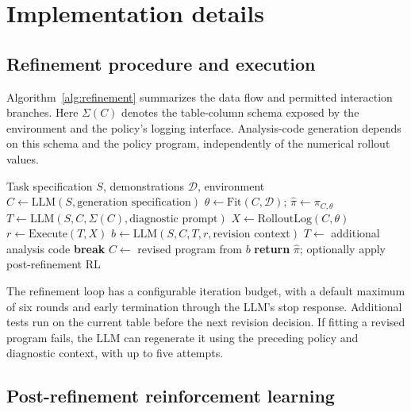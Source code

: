 \section{Implementation details}
\label{app:training}

\subsection{Refinement procedure and execution}
\label{app:procedure}
Algorithm~\ref{alg:refinement} summarizes the data flow and permitted interaction branches.
Here $\Sigma(C)$ denotes the table-column schema exposed by the environment and the policy's logging interface.
Analysis-code generation depends on this schema and the policy program, independently of the numerical rollout values.

\begin{algorithm}[htbp]
\caption{Refinement through semantic rollout analysis}
\label{alg:refinement}
\begin{algorithmic}[1]
\REQUIRE Task specification $S$, demonstrations $\mathcal D$, environment
\STATE $C\gets\mathrm{LLM}(S,\text{generation specification})$
    \STATE $\theta\gets\mathrm{Fit}(C,\mathcal D)$; $\hat\pi\gets\pi_{C,\theta}$
    \STATE $T\gets\mathrm{LLM}(S,C,\Sigma(C),\text{diagnostic prompt})$
    \STATE $X\gets\mathrm{RolloutLog}(C,\theta)$
    \REPEAT
        \STATE $r\gets\mathrm{Execute}(T,X)$
        \STATE $b\gets\mathrm{LLM}(S,C,T,r,\text{revision context})$
            \STATE $T\gets$ additional analysis code
        \ENDIF
     \STATE \textbf{break} \ENDIF
    \STATE $C\gets$ revised program from $b$
\ENDWHILE
\STATE \textbf{return} $\hat\pi$; optionally apply post-refinement RL
\end{algorithmic}
\end{algorithm}

The refinement loop has a configurable iteration budget, with a default maximum of six rounds and early termination through the LLM's stop response.
Additional tests run on the current table before the next revision decision.
If fitting a revised program fails, the LLM can regenerate it using the preceding policy and diagnostic context, with up to five attempts.


\subsection{Post-refinement reinforcement learning}
\label{app:rl}

